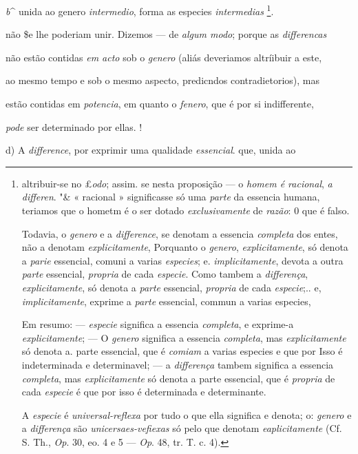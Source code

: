 \emph{b}\textasciicircum{} unida ao genero \emph{intermedio}, forma as especies \emph{intermedias} \footnote{altribuir-se no £\emph{odo}; assim. se nesta proposição --- o \emph{homem é racional}, \emph{a differen}. "\& « racional » significasse só uma \emph{parte} da essencia humana, teriamos que o hometm é o ser dotado \emph{exclusivamente} de \emph{razão}: 0 que é falso.\par Todavia, o \emph{genero} e a \emph{difference}, se denotam a essencia \emph{completa} dos entes, não a denotam \emph{explicitamente}, Porquanto o \emph{genero}, \emph{explicitamente}, só denota a \emph{parie} essencial, comuni a varias \emph{especies}; e. \emph{implicitamente}, devota a outra \emph{parte} essencial, \emph{propria} de cada \emph{especie}. Como tambem a \emph{differença}, \emph{explicitamente}, só denota a \emph{parte} essencial, \emph{propria} de cada \emph{especie};.. e, \emph{implicitamente}, exprime a \emph{parte} essencial, commun a varias especies,\par Em resumo: --- \emph{especie} significa a essencia \emph{completa}, e exprime-a \emph{explicitamente}; --- O \emph{genero} significa a essencia \emph{completa}, mas \emph{explicitamente} só denota a. parte essencial, que é \emph{comiam} a varias especies e que por Isso é indeterminada e determinavel; --- a \emph{differença} tambem significa a essencia \emph{completa}, mas \emph{explicitamente} só denota a parte essencial, que é \emph{propria} de cada \emph{especie} é que por isso é determinada e determinante.\par A \emph{especie} é \emph{universal-reflexa} por tudo o que ella significa e denota; o: \emph{genero} e a \emph{differença} são \emph{unicersaes-vefiexas} só pelo que denotam \emph{eaplicitamente} (Cf. S. Th., \emph{Op}. 30, eo. 4 e 5 --- \emph{Op}. 48, tr. T. c. 4).}.

não \$e lhe poderiam unir. Dizemos --- de \emph{algum modo}; porque as \emph{differencas}

não estão contidas \emph{em acto} sob o \emph{genero} (aliás deveriamos altríibuir a este,

ao mesmo tempo e sob o mesmo aspecto, predicndos contradietorios), mas

estão contidas em \emph{potencia}, em quanto o \emph{fenero}, que é por si indifferente,

\emph{pode} ser determinado por ellas. !

d) A \emph{difference}, por exprimir uma qualidade \emph{essencial}. que, unida ao

